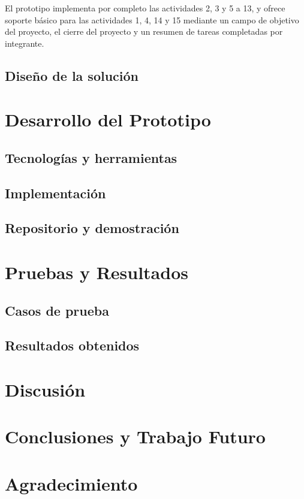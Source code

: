\documentclass[conference]{IEEEtran}
\begin{document}
El prototipo implementa por completo las actividades 2, 3 y 5 a 13, y ofrece soporte básico para las actividades 1, 4, 14 y 15 mediante un campo de objetivo del proyecto, el cierre del proyecto y un resumen de tareas completadas por integrante.
\subsection{Diseño de la solución}

\section{Desarrollo del Prototipo}
\subsection{Tecnologías y herramientas}
\subsection{Implementación}
\subsection{Repositorio y demostración}

\section{Pruebas y Resultados}
\subsection{Casos de prueba}
\subsection{Resultados obtenidos}

\section{Discusión}

\section{Conclusiones y Trabajo Futuro}

\section*{Agradecimiento}



\end{document}
